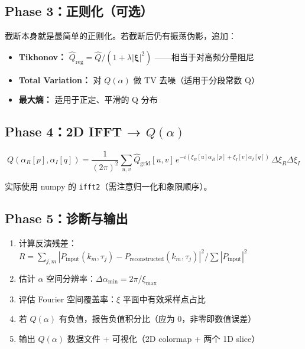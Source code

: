 \documentclass[11pt,a4paper]{ctexart}
\begin{document}
\subsection{Phase 3：正则化（可选）}

截断本身就是最简单的正则化。若截断后仍有振荡伪影，追加：

\begin{itemize}
    \item \textbf{Tikhonov：} $\hat{Q}_{\text{reg}} = \hat{Q} / (1 + \lambda|\boldsymbol{\xi}|^2)$
        ——相当于对高频分量阻尼
    \item \textbf{Total Variation：} 对 $Q(\alpha)$ 做 TV 去噪（适用于分段常数 Q）
    \item \textbf{最大熵：} 适用于正定、平滑的 Q 分布
\end{itemize}

\subsection{Phase 4：2D IFFT → $Q(\alpha)$}

\begin{equation}
    Q(\alpha_R[p], \alpha_I[q]) = \frac{1}{(2\pi)^2} \sum_{u,v}
    \hat{Q}_{\text{grid}}[u,v]\,
    e^{-i(\xi_R[u]\alpha_R[p] + \xi_I[v]\alpha_I[q])}\,
    \Delta\xi_R\Delta\xi_I
\end{equation}

实际使用 numpy 的 \texttt{ifft2}（需注意归一化和象限顺序）。

\subsection{Phase 5：诊断与输出}

\begin{enumerate}
    \item 计算反演残差：
        $R = \sum_{j,m} |P_{\text{input}}(k_m,\tau_j) -
        P_{\text{reconstructed}}(k_m,\tau_j)|^2 / \sum |P_{\text{input}}|^2$
    \item 估计 $\alpha$ 空间分辨率：$\Delta\alpha_{\min} = 2\pi / \xi_{\max}$
    \item 评估 Fourier 空间覆盖率：$\xi$ 平面中有效采样点占比
    \item 若 $Q(\alpha)$ 有负值，报告负值积分比（应为 0，非零即数值误差）
    \item 输出 $Q(\alpha)$ 数据文件 + 可视化（2D colormap + 两个 1D slice）
\end{enumerate}

\end{document}
